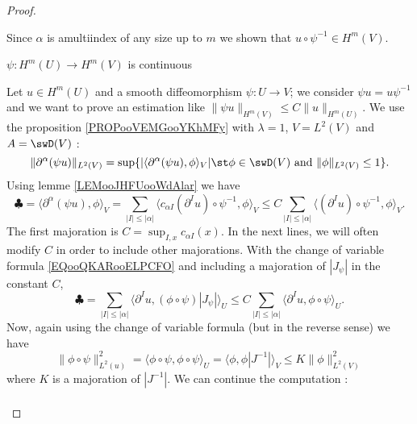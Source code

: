 \begin{proof}
\begin{subproof}
        Since \( \alpha\) is  amultiindex of any size up to \( m\) we shown that \( u\circ\psi^{-1}\in H^m(V)\).


        \item[\( \psi\colon H^m(U)\to H^m(V)\) is continuous]

            Let \( u\in H^m(U)\) and a smooth diffeomorphism \( \psi\colon U\to V\); we consider \( \psi u=u\psi^{-1}\) and we want to prove an estimation like \( \| \psi u \|_{H^m(V)}\leq C\| u \|_{H^m(U)}\). We use the proposition \ref{PROPooVEMGooYKhMFy} with \( \lambda=1\), \( V=L^2(V)\) and \( A=\swD(V)\)  :
            \begin{equation}
                \| \partial^{\alpha}(\psi u) \|_{L^2(V)}=\sup\{ | \langle \partial^{\alpha}(\psi u), \phi\rangle_V |\st \phi\in\swD(V)\text{ and }\| \phi \|_{L^2(V)}\leq 1 \}.
            \end{equation}
            Using lemme \ref{LEMooJHFUooWdAlar} we have
            \begin{equation}
                \clubsuit=\langle \partial^{\alpha}(\psi u), \phi\rangle_V=\sum_{| I |\leq | \alpha |}\langle c_{\alpha I}(\partial^Iu)\circ\psi^{-1}, \phi\rangle_V\leq C\sum_{| I |\leq | \alpha |}\langle (\partial^Iu)\circ \psi^{-1}, \phi\rangle_V.
            \end{equation}
            The first majoration is \( C=\sup_{I,x}c_{\alpha I}(x)\). In the next lines, we will often modify \( C\) in order to include other majorations. With the change of variable formula \eqref{EQooQKARooELPCFO} and including a majoration of \( | J_{\psi} |\) in the constant \( C\), 
            \begin{equation}
                \clubsuit=\sum_{| I |\leq | \alpha |}\langle \partial^Iu, (\phi\circ\psi)| J_{\psi} |\rangle_U\leq C\sum_{| I |\leq | \alpha |}\langle \partial^Iu, \phi\circ\psi\rangle_U.
            \end{equation}
            Now, again using the change of variable formula (but in the reverse sense) we have
            \begin{equation}
                \| \phi\circ\psi \|^2_{L^2(u)}=\langle \phi\circ\psi, \phi\circ\psi\rangle_U=\langle \phi, \phi| J^{-1} |\rangle_V\leq K\| \phi \|^2_{L^2(V)}
            \end{equation}
            where \( K\) is a majoration of \( | J^{-1} |\). We can continue the computation :
            \begin{subequations}
                \begin{align}

\end{align}
\end{subequations}
\end{subproof}
\end{proof}
